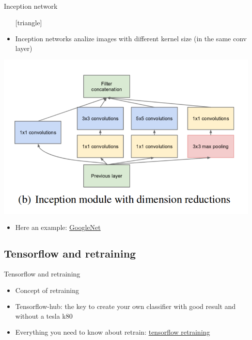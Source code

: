 \documentclass{beamer}
\begin{document}
\begin{frame}{Inception network}
\begin{itemize}
\setlength\itemsep{1em}
[triangle]
\item Inception networks analize images with different kernel size (in the same conv layer)
\end{itemize}
\begin{center}
\includegraphics[scale=0.28]{inception}
\end{center}
\begin{itemize}
\setlength\itemsep{1em}
[triangle]
\item Here an example: \href{https://bit.ly/2vBgoO3}{GoogleNet}
\end{itemize}
\end{frame}

\subsection{Tensorflow and retraining}

\begin{frame}{Tensorflow and retraining}
\begin{itemize}
\setlength\itemsep{1em}
[triangle]
\item Concept of retraining
\item Tensorflow-hub: the key to create your own classifier with good result and without a tesla k80
\item Everything you need to know about retrain: \href{https://www.tensorflow.org/hub/tutorials/image_retraining}{tensorflow retraining}
\end{itemize}
\end{frame}
\end{document}
